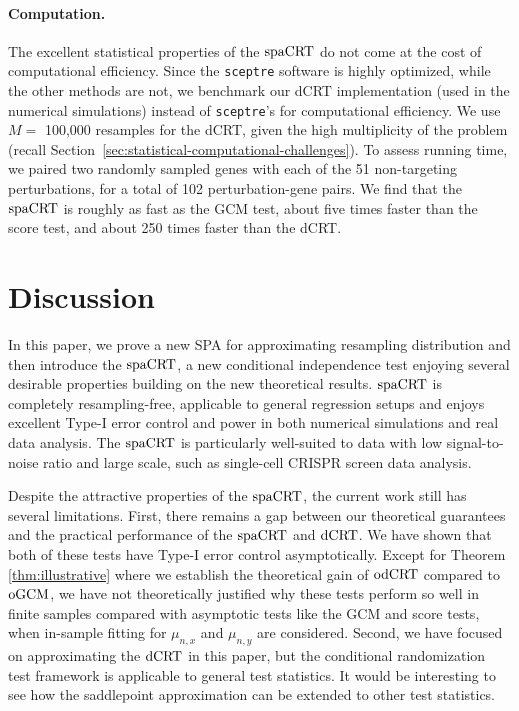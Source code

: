 \documentclass[12pt]{article}
\theoremstyle{definition}
\newcommand{\dCRT}{\textnormal{dCRT}} 					%
\newcommand{\odCRT}{\textnormal{odCRT}} 					%
\newcommand{\oGCM}{\textnormal{oGCM}}						%
\newcommand{\spacrt}{\textnormal{spaCRT}}               %
\begin{document}
  
  \paragraph{Computation.}
  
  The excellent statistical properties of the $\spacrt$ do not come at the cost of computational efficiency. Since the \verb|sceptre| software is highly optimized, while the other methods are not, we benchmark our dCRT implementation (used in the numerical simulations) instead of \verb|sceptre|'s for computational efficiency. We use $M = $ 100,000 resamples for the dCRT, given the high multiplicity of the problem (recall Section~\ref{sec:statistical-computational-challenges}). To assess running time, we paired two randomly sampled genes with each of the 51 non-targeting perturbations, for a total of 102 perturbation-gene pairs. We find that the $\spacrt$ is roughly as fast as the GCM test, about five times faster than the score test, and about 250 times faster than the dCRT.
  
  
  
  \section{Discussion} \label{sec:discussion}
  
  In this paper, we prove a new SPA for approximating resampling distribution and then introduce the $\spacrt$, a new conditional independence test enjoying several desirable properties building on the new theoretical results. $\spacrt$ is completely resampling-free, applicable to general regression setups and enjoys excellent Type-I error control and power in both numerical simulations and real data analysis. The $\spacrt$ is particularly well-suited to data with low signal-to-noise ratio and large scale, such as single-cell CRISPR screen data analysis.
  
  Despite the attractive properties of the $\spacrt$, the current work still has several limitations. First, there remains a gap between our theoretical guarantees and the practical performance of the $\spacrt$ and $\dCRT$. We have shown that both of these tests have Type-I error control asymptotically. Except for Theorem \ref{thm:illustrative} where we establish the theoretical gain of $\odCRT$ compared to $\oGCM$, we have not theoretically justified why these tests perform so well in finite samples compared with asymptotic tests like the GCM and score tests, when in-sample fitting for $\mu_{n,x}$ and $\mu_{n,y}$ are considered. Second, we have focused on approximating the $\dCRT$ in this paper, but the conditional randomization test framework is applicable to general test statistics. It would be interesting to see how the saddlepoint approximation can be extended to other test statistics.
  
\end{document}
